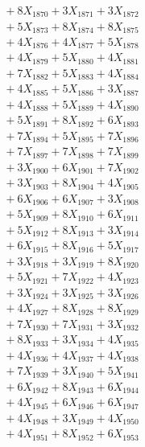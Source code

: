 \documentclass[a4paper,10pt]{article}
\begin{document}
{\begin{align}
&\;  + 8 X_{1870} + 3 X_{1871} + 3 X_{1872} \\[0.3ex]
&\;  + 5 X_{1873} + 8 X_{1874} + 8 X_{1875} \\[0.3ex]
&\;  + 4 X_{1876} + 4 X_{1877} + 5 X_{1878} \\[0.3ex]
&\;  + 4 X_{1879} + 5 X_{1880} + 4 X_{1881} \\[0.3ex]
&\;  + 7 X_{1882} + 5 X_{1883} + 4 X_{1884} \\[0.3ex]
&\;  + 4 X_{1885} + 5 X_{1886} + 3 X_{1887} \\[0.3ex]
&\;  + 4 X_{1888} + 5 X_{1889} + 4 X_{1890} \\[0.3ex]
&\;  + 5 X_{1891} + 8 X_{1892} + 6 X_{1893} \\[0.3ex]
&\;  + 7 X_{1894} + 5 X_{1895} + 7 X_{1896} \\[0.3ex]
&\;  + 7 X_{1897} + 7 X_{1898} + 7 X_{1899} \\[0.5ex]\allowbreak
&\;  + 3 X_{1900} + 6 X_{1901} + 7 X_{1902} \\[0.3ex]
&\;  + 3 X_{1903} + 8 X_{1904} + 4 X_{1905} \\[0.3ex]
&\;  + 6 X_{1906} + 6 X_{1907} + 3 X_{1908} \\[0.3ex]
&\;  + 5 X_{1909} + 8 X_{1910} + 6 X_{1911} \\[0.3ex]
&\;  + 5 X_{1912} + 8 X_{1913} + 3 X_{1914} \\[0.3ex]
&\;  + 6 X_{1915} + 8 X_{1916} + 5 X_{1917} \\[0.3ex]
&\;  + 3 X_{1918} + 3 X_{1919} + 8 X_{1920} \\[0.3ex]
&\;  + 5 X_{1921} + 7 X_{1922} + 4 X_{1923} \\[0.3ex]
&\;  + 3 X_{1924} + 3 X_{1925} + 3 X_{1926} \\[0.3ex]
&\;  + 4 X_{1927} + 8 X_{1928} + 8 X_{1929} \\[0.5ex]\allowbreak
&\;  + 7 X_{1930} + 7 X_{1931} + 3 X_{1932} \\[0.3ex]
&\;  + 8 X_{1933} + 3 X_{1934} + 4 X_{1935} \\[0.3ex]
&\;  + 4 X_{1936} + 4 X_{1937} + 4 X_{1938} \\[0.3ex]
&\;  + 7 X_{1939} + 3 X_{1940} + 5 X_{1941} \\[0.3ex]
&\;  + 6 X_{1942} + 8 X_{1943} + 6 X_{1944} \\[0.3ex]
&\;  + 4 X_{1945} + 6 X_{1946} + 6 X_{1947} \\[0.3ex]
&\;  + 4 X_{1948} + 3 X_{1949} + 4 X_{1950} \\[0.3ex]
&\;  + 4 X_{1951} + 8 X_{1952} + 6 X_{1953} \\[0.3ex]

\end{align}}
\end{document}

